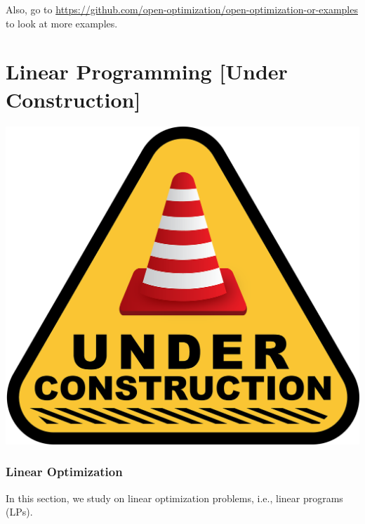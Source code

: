 \documentclass[letter,12pt]{book}
\renewcommand{\0}{\mathbf{0}}
\begin{document}
Also, go to \url{https://github.com/open-optimization/open-optimization-or-examples} to look at more examples.








\part{Linear Programming [Under Construction]}

\begin{center}
\href{https://pixabay.com/illustrations/under-construction-construction-sign-2408060/}{\includegraphics[scale = 0.1]{optimization/figures/under-construction-2408060_1280}}
\end{center}




%


\ifdefined \oldstuff
\newpage \section{Linear Optimization}
In this section, we study on linear optimization problems, i.e., linear programs (LPs).
\end{document}
